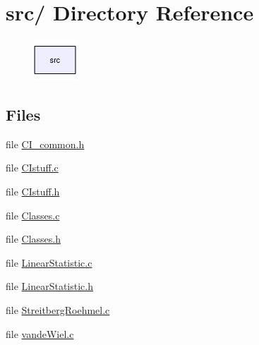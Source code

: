 \hypertarget{dir_000000}{
\section{src/ Directory Reference}
\label{dir_000000}
}


\begin{figure}[H]
\begin{center}
\leavevmode
\includegraphics[width=45pt]{dir_000000_dep}
\end{center}
\end{figure}
\subsection*{Files}
\begin{CompactItemize}
\item 
file \hyperlink{CI__common_8h}{CI\_\-common.h}
\item 
file \hyperlink{CIstuff_8c}{CIstuff.c}
\item 
file \hyperlink{CIstuff_8h}{CIstuff.h}
\item 
file \hyperlink{Classes_8c}{Classes.c}
\item 
file \hyperlink{Classes_8h}{Classes.h}
\item 
file \hyperlink{LinearStatistic_8c}{Linear\-Statistic.c}
\item 
file \hyperlink{LinearStatistic_8h}{Linear\-Statistic.h}
\item 
file \hyperlink{StreitbergRoehmel_8c}{Streitberg\-Roehmel.c}
\item 
file \hyperlink{vandeWiel_8c}{vande\-Wiel.c}
\end{CompactItemize}
